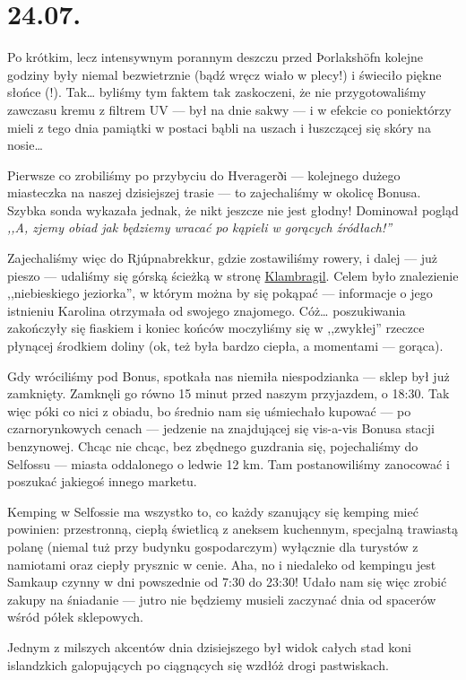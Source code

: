 \chapter*{24.07.}

Po krótkim, lecz intensywnym porannym deszczu przed Þorlakshöfn kolejne godziny były niemal bezwietrznie (bądź wręcz wiało w plecy!) i świeciło piękne słońce (!). Tak… byliśmy tym faktem tak zaskoczeni, że nie przygotowaliśmy zawczasu kremu z filtrem UV --- był na dnie sakwy --- i w efekcie co poniektórzy mieli z tego dnia pamiątki w postaci bąbli na uszach i łuszczącej się skóry na nosie…


Pierwsze co zrobiliśmy po przybyciu do Hveragerði --- kolejnego dużego miasteczka na naszej dzisiejszej trasie --- to zajechaliśmy w okolicę Bonusa. Szybka sonda wykazała jednak, że nikt jeszcze nie jest głodny! Dominował pogląd \emph{,,A, zjemy obiad jak będziemy wracać po kąpieli w gorących źródłach!''}

Zajechaliśmy więc do Rjúpnabrekkur, gdzie zostawiliśmy rowery, i dalej --- już pieszo --- udaliśmy się górską ścieżką w stronę \href{http://www.vulkaner.no/t/isl2004/hot.html}{Klambragil}. Celem było znalezienie ,,niebieskiego jeziorka'', w którym można by się pokąpać --- informacje o jego istnieniu Karolina otrzymała od swojego znajomego. Cóż… poszukiwania zakończyły się fiaskiem i koniec końców moczyliśmy się w ,,zwykłej'' rzeczce płynącej środkiem doliny (ok, też była bardzo ciepła, a momentami --- gorąca).


Gdy wróciliśmy pod Bonus, spotkała nas niemiła niespodzianka --- sklep był już zamknięty. Zamknęli go równo 15 minut przed naszym przyjazdem, o 18:30. Tak więc póki co nici z obiadu, bo średnio nam się uśmiechało kupować --- po czarnorynkowych cenach --- jedzenie na znajdującej się vis-a-vis Bonusa stacji benzynowej. Chcąc nie chcąc, bez zbędnego guzdrania się, pojechaliśmy do Selfossu --- miasta oddalonego o ledwie 12 km. Tam postanowiliśmy zanocować i poszukać jakiegoś innego marketu.

Kemping w Selfossie ma wszystko to, co każdy szanujący się kemping mieć powinien: przestronną, ciepłą świetlicą z aneksem kuchennym, specjalną trawiastą polanę (niemal tuż przy budynku gospodarczym) wyłącznie dla turystów z namiotami oraz ciepły prysznic w cenie. Aha, no i niedaleko od kempingu jest Samkaup czynny w dni powszednie od 7:30 do 23:30! Udało nam się więc zrobić zakupy na śniadanie --- jutro nie będziemy musieli zaczynać dnia od spacerów wśród półek sklepowych.

Jednym z milszych akcentów dnia dzisiejszego był widok całych stad koni islandzkich galopujących po ciągnących się wzdłóż drogi pastwiskach.